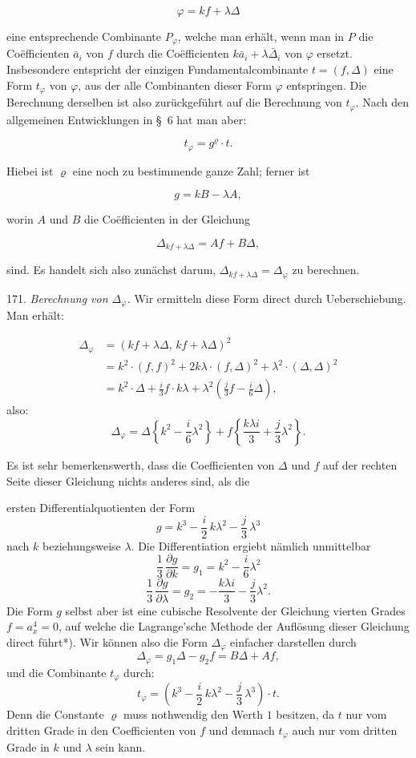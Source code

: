 \documentclass[11pt]{article}
\providecommand{\weberpage}[1]{}
\providecommand{\weq}[2]{\begin{equation}\tag{#1}#2\end{equation}}
\let\Delta\varDelta
\begin{document}
\[
\varphi = kf + \lambda\Delta
\]

eine entsprechende Combinante $P_\varphi$, welche man erhält, wenn man in $P$ die Co\"efficienten $\bar a_i$ von $f$ durch die Co\"efficienten $k\bar a_i+\lambda\bar\Delta_i$ von $\varphi$ ersetzt. Insbesondere entspricht der einzigen Fundamentalcombinante $t=(f,\Delta)$ eine Form $t_\varphi$ von $\varphi$, aus der alle Combinanten dieser Form $\varphi$ entspringen. Die Berechnung derselben ist also zurückgeführt auf die Berechnung von $t_\varphi$. Nach den allgemeinen Entwicklungen in \S~6 hat man aber:

\weq{II}{t_\varphi = g^\varrho\cdot t.}

Hiebei ist $\varrho$ eine noch zu bestimmende ganze Zahl; ferner ist

\[
g = kB - \lambda A,
\]

worin $A$ und $B$ die Co\"efficienten in der Gleichung

\[
\Delta_{kf+\lambda\Delta} = Af+B\Delta,
\]

sind. Es handelt sich also zunächst darum, $\Delta_{kf+\lambda\Delta}=\Delta_\varphi$ zu berechnen.

171. \textit{Berechnung von $\Delta_\varphi$.} Wir ermitteln diese Form direct durch Ueberschiebung. Man erhält:

\[
\begin{aligned}
\Delta_\varphi &= (kf+\lambda\Delta,\,kf+\lambda\Delta)^2\\
&= k^2\cdot(f,f)^2 + 2k\lambda\cdot(f,\Delta)^2 + \lambda^2\cdot(\Delta,\Delta)^2\\
&= k^2\cdot\Delta + \frac{i}{3}f\cdot k\lambda + \lambda^2\left(\frac{j}{3}f-\frac{i}{6}\Delta\right),
\end{aligned}
\]
also:
\[
\Delta_\varphi = \Delta\left\{k^2-\frac{i}{6}\lambda^2\right\} + f\left\{\frac{k\lambda i}{3}+\frac{j}{3}\lambda^2\right\}.
\]

Es ist sehr bemerkenswerth, dass die Coefficienten von $\Delta$ und $f$ auf der rechten Seite dieser Gleichung nichts anderes sind, als die


\weberpage{189}
ersten Differentialquotienten der Form
\weq{III}{g = k^3 - \frac{i}{2}\,k\lambda^2 - \frac{j}{3}\,\lambda^3}
nach $k$ beziehungsweise $\lambda$. Die Differentiation ergiebt nämlich unmittelbar
\[
\frac{1}{3}\,\frac{\partial g}{\partial k} = g_1 = k^2 - \frac{i}{6}\lambda^2
\]
\[
\frac{1}{3}\,\frac{\partial g}{\partial \lambda} = g_2 = -\frac{k\lambda i}{3} - \frac{j}{3}\lambda^2 .
\]
Die Form $g$ selbst aber ist eine cubische Resolvente der Gleichung
vierten Grades $f = a_x^4 = 0$, auf welche die Lagrange'sche Methode der
Auflösung dieser Gleichung direct führt*). Wir können also die Form
$\varDelta_\varphi$ einfacher darstellen durch
\[
\varDelta_\varphi = g_1\varDelta - g_2 f = B\varDelta + Af,
\]
und die Combinante $t_\varphi$ durch:
\[
t_\varphi = \left(k^3 - \frac{i}{2}\,k\lambda^2 - \frac{j}{3}\,\lambda^3\right)\cdot t .
\]
Denn die Constante $\varrho$ muss nothwendig den Werth $1$ besitzen,
da $t$ nur vom dritten Grade in den Coefficienten von $f$ und demnach
$t_\varphi$ auch nur vom dritten Grade in $k$ und $\lambda$ sein kann.
\end{document}
